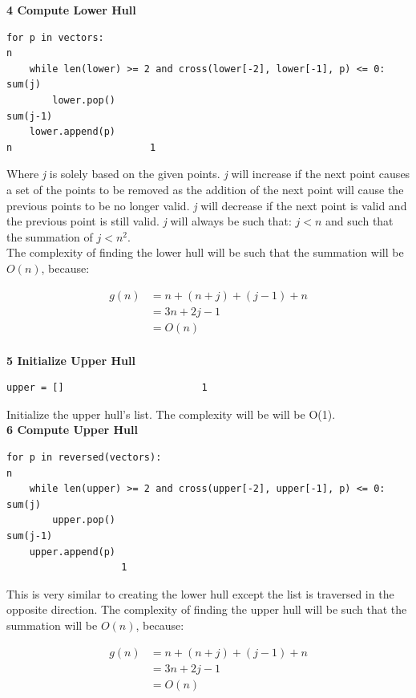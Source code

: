 \documentclass[pdftex,12pt,a4paper]{article}
\newcommand{\nspace}{\\[0.25cm]}
\newcommand{\lspace}{\\[0.50cm]}
\begin{document}
{\bf \large 4 Compute Lower Hull}
\begin{verbatim}
for p in vectors:                                                     n
    while len(lower) >= 2 and cross(lower[-2], lower[-1], p) <= 0:    sum(j)
        lower.pop()                                                   sum(j-1)
    lower.append(p)                                                   n                        1
\end{verbatim}

Where \emph{j} is solely based on the given points. \emph{j} will increase if the next point causes a set of the points to be removed as the addition of the next point will cause the previous points to be no longer valid. \emph{j} will decrease if the next point is valid and the previous point is still valid. \emph{j} will always be such that: $j < n$ and such that the summation of $j < n^2$.\nspace

The complexity of finding the lower hull will be such that the summation will be $O(n)$, because:

\begin{equation}
\begin{split}
g(n) &= n + (n + j) + (j-1) + n\\
     &= 3n + 2j - 1\\
     &= O(n)\\
\end{split}
\end{equation}
		
		
{\bf \large 5 Initialize Upper Hull}
\begin{verbatim}
upper = []                        1
\end{verbatim}

Initialize the upper hull's list. The complexity will be will be O(1).\lspace


{\bf \large 6 Compute Upper Hull}
\begin{verbatim}
for p in reversed(vectors):                                           n
    while len(upper) >= 2 and cross(upper[-2], upper[-1], p) <= 0:    sum(j)
        upper.pop()                                                   sum(j-1)
    upper.append(p)
                    1
\end{verbatim}

This is very similar to creating the lower hull except the list is traversed in the opposite direction. The complexity of finding the upper hull will be such that the summation will be 
$O(n)$, because:

\begin{equation}
\begin{split}
g(n) &= n + (n + j) + (j-1) + n\\
     &= 3n + 2j - 1\\
     &= O(n)\\
\end{split}
\end{equation}
		
\end{document}
